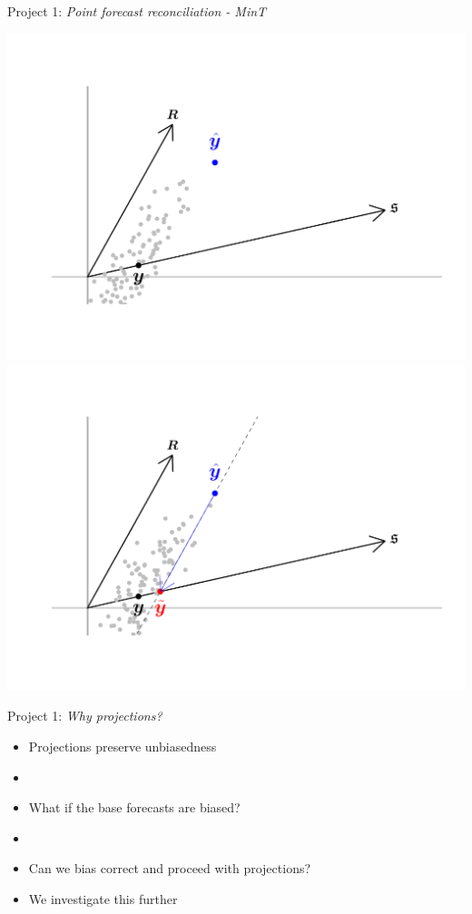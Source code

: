 \documentclass[11pt,xcolor=dvipsnames,handout]{beamer} %
\begin{document}
\begin{frame}{Project 1: \textit{Point forecast reconciliation - MinT}}
\begin{itemize}[<+-| alert@+>]
{\begin{overprint}
			\includegraphics[scale=0.55]{Figs/MinT_justif/SampleEstimates.pdf}
			\onslide<+|handout:0>
			\includegraphics[scale=0.55]{Figs/MinT_justif/ObliqueProjection.pdf}
		\end{overprint}	
}
\end{itemize}    
\end{frame}



\begin{frame}{Project 1: \textit{Why projections?}}
\begin{itemize}[<+-| alert@+>]
	\item Projections preserve unbiasedness
	\item[]
	\item What if the base forecasts are biased?
	\item[]
	\item Can we bias correct and proceed with projections? 
	\item[] We investigate this further
\end{itemize}    
\end{frame}
\end{document}

